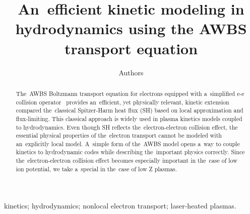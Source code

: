 \documentclass[preprint,12pt]{elsarticle}
\begin{document}
\begin{frontmatter}



\title{An~efficient kinetic modeling in hydrodynamics using the AWBS transport equation}


\author[a,b]{Authors}

\address[a]{Centre Lasers Intenses et Applications, Universite de Bordeaux-CNRS-CEA, UMR 5107, F-33405 Talence, France}

\begin{abstract}
The~AWBS Boltzmann transport equation for electrons equipped with 
a~simplified e-e collision operator~\cite{AWBS_PRL1986}
provides an~efficient, yet physically 
relevant, kinetic extension compared the~classical 
Spitzer-Harm heat flux (SH)
based on local approximation and flux-limiting.
This classical approach is widely used in plasma
kinetics models coupled to hydrodynamics. 
Even though SH reflects the~electron-electron collision effect, 
the essential physical properties
of the~electron transport cannot be modeled with 
an~explicitly local model. A~simple form of the~AWBS model opens a~way 
to couple kinetics to hydrodynamic codes while describing the~important 
physics correctly. Since the~electron-electron collision effect becomes 
especially important in the~case of low ion potential, we take a~special in 
the~case of low Z plasmas.
\end{abstract}

\begin{keyword}
kinetics; hydrodynamics; nonlocal electron transport; laser-heated plasmas.

\end{keyword}

\end{frontmatter}
\end{document}
